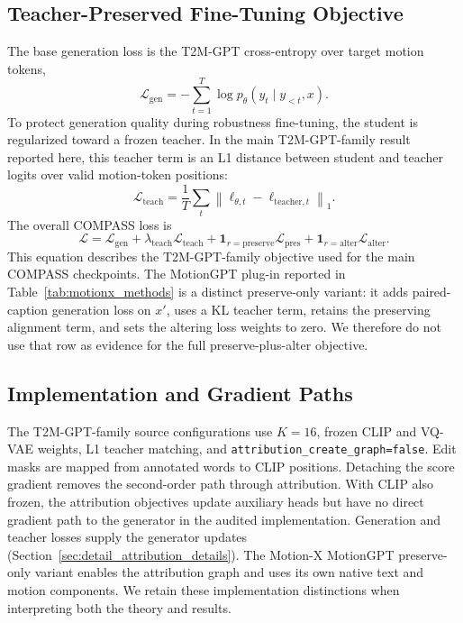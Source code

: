 \subsection{Teacher-Preserved Fine-Tuning Objective}
The base generation loss is the T2M-GPT cross-entropy over target motion tokens,
\begin{equation}
    \mathcal{L}_{\mathrm{gen}}
    =
    -\sum_{t=1}^{T}\log p_{\theta}(y_t\mid y_{<t},x).
\end{equation}
To protect generation quality during robustness fine-tuning, the student is
regularized toward a frozen teacher. In the main T2M-GPT-family result reported
here, this teacher term is an L1 distance between student and teacher logits over
valid motion-token positions:
\begin{equation}
    \mathcal{L}_{\mathrm{teach}}
    =
    \frac{1}{T}\sum_t
    \left\lVert \ell_{\theta,t}-\ell_{\mathrm{teacher},t}\right\rVert_1 .
\end{equation}
The overall COMPASS loss is
\begin{equation}
    \mathcal{L}
    =
    \mathcal{L}_{\mathrm{gen}}
    +\lambda_{\mathrm{teach}}\mathcal{L}_{\mathrm{teach}}
    +\mathbf{1}_{r=\mathrm{preserve}}\mathcal{L}_{\mathrm{pres}}
    +\mathbf{1}_{r=\mathrm{alter}}\mathcal{L}_{\mathrm{alter}} .
\end{equation}
This equation describes the T2M-GPT-family objective used for the main COMPASS
checkpoints.  The MotionGPT plug-in reported in
Table~\ref{tab:motionx_methods} is a distinct preserve-only variant: it adds
paired-caption generation loss on $x'$, uses a KL teacher term, retains the
preserving alignment term, and sets the altering loss
weights to zero.  We therefore do not use that row as evidence for the full
preserve-plus-alter objective.

\subsection{Implementation and Gradient Paths}
The T2M-GPT-family source configurations use $K=16$, frozen CLIP and VQ-VAE
weights, L1 teacher matching, and
\texttt{attribution\_create\_graph=false}. Edit masks are mapped from annotated
words to CLIP positions. Detaching the score gradient removes the
second-order path through attribution. With CLIP also frozen, the attribution
objectives update auxiliary heads but have no direct gradient path to the
generator in the audited implementation. Generation and teacher losses supply
the generator updates (Section~\ref{sec:detail_attribution_details}).
The Motion-X MotionGPT preserve-only variant enables the attribution graph
and uses its own native text and motion components. We retain these
implementation distinctions when interpreting both the theory and results.

